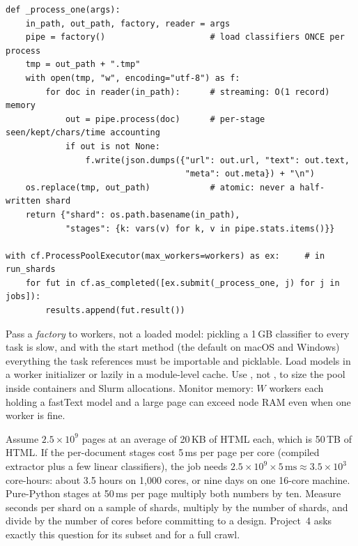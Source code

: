 \begin{lstlisting}[caption={The shard worker: per-process pipeline, atomic write, returned counters (from \code{llmsys/datapipe/pipeline.py}).},label={lst:data:shards}]
def _process_one(args):
    in_path, out_path, factory, reader = args
    pipe = factory()                     # load classifiers ONCE per process
    tmp = out_path + ".tmp"
    with open(tmp, "w", encoding="utf-8") as f:
        for doc in reader(in_path):      # streaming: O(1 record) memory
            out = pipe.process(doc)      # per-stage seen/kept/chars/time accounting
            if out is not None:
                f.write(json.dumps({"url": out.url, "text": out.text,
                                    "meta": out.meta}) + "\n")
    os.replace(tmp, out_path)            # atomic: never a half-written shard
    return {"shard": os.path.basename(in_path),
            "stages": {k: vars(v) for k, v in pipe.stats.items()}}

with cf.ProcessPoolExecutor(max_workers=workers) as ex:     # in run_shards
    for fut in cf.as_completed([ex.submit(_process_one, j) for j in jobs]):
        results.append(fut.result())
\end{lstlisting}

\begin{pitfall}
Pass a \emph{factory} to workers, not a loaded model: pickling a 1\,GB classifier to every task
is slow, and with the  start method (the default on macOS and Windows) everything the
task references must be importable and picklable. Load models in a worker initializer or lazily
in a module-level cache. Use , not ,
to size the pool inside containers and Slurm allocations. Monitor memory: $W$ workers each holding a
fastText model and a large page can exceed node RAM even when one worker is fine.
\end{pitfall}

\begin{napkinmath}
Assume $2.5\times10^{9}$ pages at an average of 20\,KB of HTML each, which is 50\,TB of HTML. If the
per-document stages cost 5\,ms per page per core (compiled extractor plus a few linear classifiers),
the job needs $2.5\times10^{9}\times5\,\text{ms}\approx3.5\times10^{3}$ core-hours: about 3.5 hours on
1{,}000 cores, or nine days on one 16-core machine. Pure-Python stages at 50\,ms per page multiply
both numbers by ten. Measure seconds per shard on a sample of shards, multiply by the number of shards,
and divide by the number of cores before committing to a design. Project~4 asks exactly this
question for its subset and for a full crawl.
\end{napkinmath}

